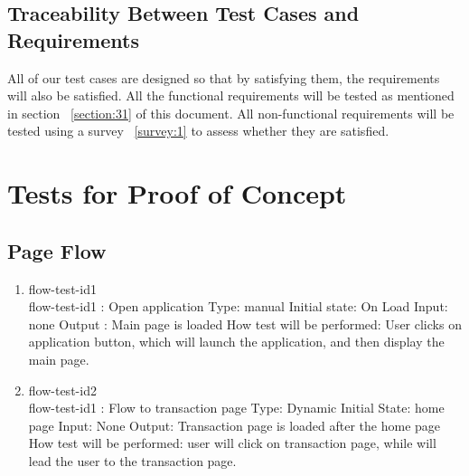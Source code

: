 \documentclass[12pt, titlepage]{article}
\begin{document}
\subsection{Traceability Between Test Cases and Requirements}
All of our test cases are designed so that by satisfying them, the requirements will also be satisfied. All the functional requirements will be tested as mentioned in section ~\ref{section:31} of this document. All non-functional requirements will be tested using a survey ~\ref{survey:1} to assess whether they are satisfied.

\section{Tests for Proof of Concept}

\subsection{Page Flow}

\begin{enumerate}

\item{flow-test-id1\\}
flow-test-id1 : Open application
\newline
Type: manual 
\newline
Initial state: On Load 
\newline
Input: none
\newline
Output : Main page is loaded 
\newline
How test will be performed: User clicks on application button, which will launch the application, and then display the main page. 



					
\item{flow-test-id2\\}
flow-test-id1 : Flow to transaction page
\newline
Type: Dynamic
\newline
Initial State: home page 
\newline
Input: None
\newline
Output: Transaction page is loaded after the home page 
\newline
How test will be performed:  user will click on transaction page, while will lead the user to the transaction page. 



\end{enumerate}
\end{document}
